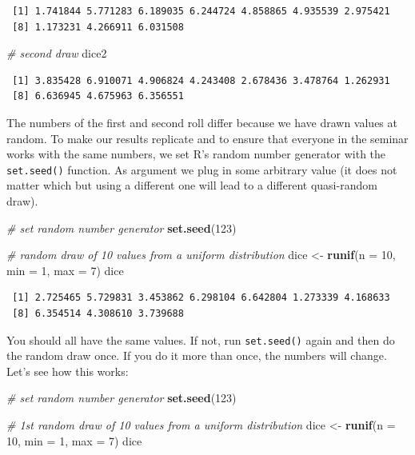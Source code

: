 \documentclass[]{article}
\newenvironment{Shaded}{\begin{snugshade}}{\end{snugshade}}
\newcommand{\CommentTok}[1]{\textcolor[rgb]{0.56,0.35,0.01}{\textit{#1}}}
\newcommand{\DataTypeTok}[1]{\textcolor[rgb]{0.13,0.29,0.53}{#1}}
\newcommand{\DecValTok}[1]{\textcolor[rgb]{0.00,0.00,0.81}{#1}}
\newcommand{\KeywordTok}[1]{\textcolor[rgb]{0.13,0.29,0.53}{\textbf{#1}}}
\newcommand{\NormalTok}[1]{#1}
\newcommand{\StringTok}[1]{\textcolor[rgb]{0.31,0.60,0.02}{#1}}
\begin{document}
\begin{verbatim}
 [1] 1.741844 5.771283 6.189035 6.244724 4.858865 4.935539 2.975421
 [8] 1.173231 4.266911 6.031508
\end{verbatim}

\begin{Shaded}
\begin{Highlighting}[]
\CommentTok{# second draw}
\NormalTok{dice2}
\end{Highlighting}
\end{Shaded}

\begin{verbatim}
 [1] 3.835428 6.910071 4.906824 4.243408 2.678436 3.478764 1.262931
 [8] 6.636945 4.675963 6.356551
\end{verbatim}

The numbers of the first and second roll differ because we have drawn values at random. To make our results replicate and to ensure that everyone in the seminar works with the same numbers, we set R's random number generator with the \texttt{set.seed()} function. As argument we plug in some arbitrary value (it does not matter which but using a different one will lead to a different quasi-random draw).

\begin{Shaded}
\begin{Highlighting}[]
\CommentTok{# set random number generator}
\KeywordTok{set.seed}\NormalTok{(}\DecValTok{123}\NormalTok{)}

\CommentTok{# random draw of 10 values from a uniform distribution}
\NormalTok{dice <-}\StringTok{ }\KeywordTok{runif}\NormalTok{(}\DataTypeTok{n =} \DecValTok{10}\NormalTok{, }\DataTypeTok{min =} \DecValTok{1}\NormalTok{, }\DataTypeTok{max =} \DecValTok{7}\NormalTok{)}
\NormalTok{dice}
\end{Highlighting}
\end{Shaded}

\begin{verbatim}
 [1] 2.725465 5.729831 3.453862 6.298104 6.642804 1.273339 4.168633
 [8] 6.354514 4.308610 3.739688
\end{verbatim}

You should all have the same values. If not, run \texttt{set.seed()} again and then do the random draw once. If you do it more than once, the numbers will change. Let's see how this works:

\begin{Shaded}
\begin{Highlighting}[]
\CommentTok{# set random number generator}
\KeywordTok{set.seed}\NormalTok{(}\DecValTok{123}\NormalTok{)}

\CommentTok{# 1st random draw of 10 values from a uniform distribution}
\NormalTok{dice <-}\StringTok{ }\KeywordTok{runif}\NormalTok{(}\DataTypeTok{n =} \DecValTok{10}\NormalTok{, }\DataTypeTok{min =} \DecValTok{1}\NormalTok{, }\DataTypeTok{max =} \DecValTok{7}\NormalTok{)}
\NormalTok{dice}
\end{Highlighting}
\end{Shaded}
\end{document}
